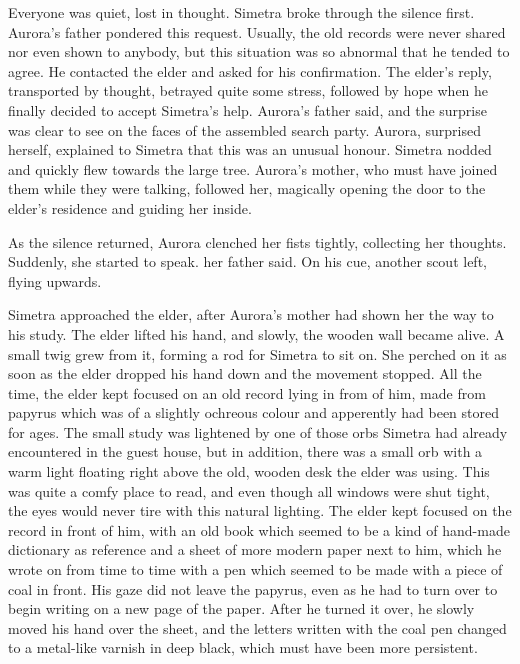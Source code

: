 Everyone was quiet, lost in thought. Simetra broke through the silence first.  Aurora's father pondered this request. Usually, the old records were never shared nor even shown to anybody, but this situation was so abnormal that he tended to agree. He contacted the elder and asked for his confirmation. The elder's reply, transported by thought, betrayed quite some stress, followed by hope when he finally decided to accept Simetra's help.  Aurora's father said, and the surprise was clear to see on the faces of the assembled search party. Aurora, surprised herself, explained to Simetra that this was an unusual honour. Simetra nodded and quickly flew towards the large tree. Aurora's mother, who must have joined them while they were talking, followed her, magically opening the door to the elder's residence and guiding her inside.

As the silence returned, Aurora clenched her fists tightly, collecting her thoughts. Suddenly, she started to speak.   her father said.  On his cue, another scout left, flying upwards.

\fancybreaker{}

Simetra approached the elder, after Aurora's mother had shown her the way to his study. The elder lifted his hand, and slowly, the wooden wall became alive. A small twig grew from it, forming a rod for Simetra to sit on. She perched on it as soon as the elder dropped his hand down and the movement stopped. All the time, the elder kept focused on an old record lying in from of him, made from papyrus which was of a slightly ochreous colour and apperently had been stored for ages. The small study was lightened by one of those orbs Simetra had already encountered in the guest house, but in addition, there was a small orb with a warm light floating right above the old, wooden desk the elder was using. This was quite a comfy place to read, and even though all windows were shut tight, the eyes would never tire with this natural lighting. The elder kept focused on the record in front of him, with an old book which seemed to be a kind of hand-made dictionary as reference and a sheet of more modern paper next to him, which he wrote on from time to time with a pen which seemed to be made with a piece of coal in front. His gaze did not leave the papyrus, even as he had to turn over to begin writing on a new page of the paper. After he turned it over, he slowly moved his hand over the sheet, and the letters written with the coal pen changed to a metal-like varnish in deep black, which must have been more persistent. 

